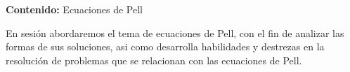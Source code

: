 {\Large\textbf{Contenido:} Ecuaciones de Pell}

En sesión abordaremos el tema de ecuaciones de Pell, con el fin de analizar las formas de sus soluciones, asi como
desarrolla habilidades y destrezas en la resolución de problemas que se relacionan con las ecuaciones de Pell.

